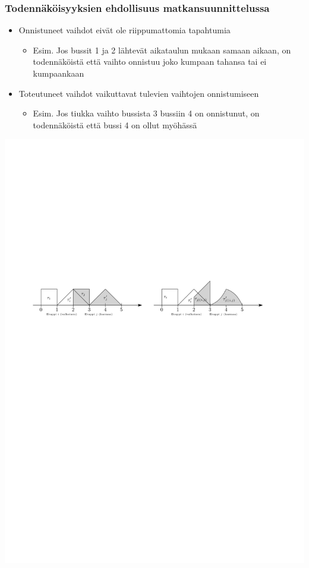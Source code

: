 \documentclass{beamer}
\begin{document}
    
            \begin{frame}
  \frametitle{Todennäköisyyksien ehdollisuus matkansuunnittelussa} 
  \begin{itemize}
       \item
    Onnistuneet vaihdot eivät ole riippumattomia tapahtumia
        \begin{itemize}
     \item 
     Esim. Jos bussit 1 ja 2 lähtevät aikataulun mukaan samaan aikaan, on todennäköistä että 
     vaihto onnistuu joko kumpaan tahansa tai ei kumpaankaan
    \end{itemize}
   \item 
    Toteutuneet vaihdot vaikuttavat tulevien vaihtojen onnistumiseen
    \begin{itemize}
     \item 
     Esim. Jos tiukka vaihto bussista 3 bussiin 4 on onnistunut, on todennäköistä että bussi 4 on ollut myöhässä
    \end{itemize}
\end{itemize}
     \begin{center}
     \includegraphics[scale=0.65]{stateexample}
      \end{center}
    \end{frame}  
    
\end{document}
